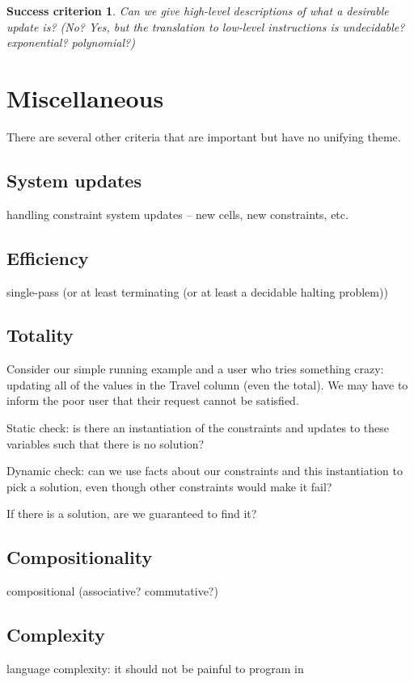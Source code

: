 \documentclass{article}
\newtheorem{success}{Success criterion}
\begin{document}
\begin{success}
    Can we give high-level descriptions of what a desirable update is? (No?
    Yes, but the translation to low-level instructions is undecidable?
    exponential? polynomial?)
\end{success}

\section{Miscellaneous}
There are several other criteria that are important but have no unifying
theme.

\subsection{System updates}
handling constraint system updates -- new cells, new constraints, etc.

\subsection{Efficiency}
single-pass (or at least terminating (or at least a decidable halting problem))

\subsection{Totality}
Consider our simple running example and a user who tries something crazy:
updating all of the values in the Travel column (even the total). We may
have to inform the poor user that their request cannot be satisfied.

Static check: is there an instantiation of the constraints and updates to
these variables such that there is no solution?

Dynamic check: can we use facts about our constraints and this instantiation
to pick a solution, even though other constraints would make it fail?

If there is a solution, are we guaranteed to find it?

\subsection{Compositionality}
compositional (associative? commutative?)

\subsection{Complexity}
language complexity: it should not be painful to program in
\end{document}
